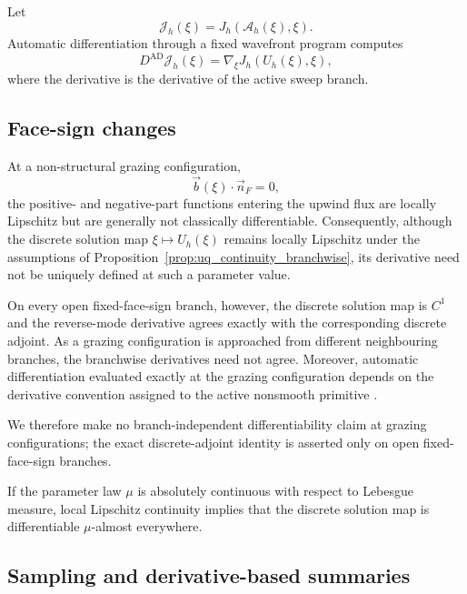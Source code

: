 \documentclass[final]{amsart}
\begin{document}
Let
\begin{equation}
  \mathcal{J}_h(\xi)
  =
  J_h(\mathcal{A}_h(\xi),\xi).
\end{equation}
Automatic differentiation through a fixed wavefront program computes
\begin{equation}
  D^{\mathrm{AD}}\mathcal{J}_h(\xi)
  =
  \nabla_\xi J_h(U_h(\xi),\xi),
  \label{eq:uq_ad_derivative}
\end{equation}
where the derivative is the derivative of the active sweep branch.

\subsection{Face-sign changes}

At a non-structural grazing configuration,
\[
  \vec b(\xi)\cdot\vec n_F=0,
\]
the positive- and negative-part functions entering the upwind flux are
locally Lipschitz but are generally not classically differentiable.
Consequently, although the discrete solution map
$\xi\mapsto U_h(\xi)$ remains locally Lipschitz under the assumptions of
Proposition~\ref{prop:uq_continuity_branchwise}, its derivative need not
be uniquely defined at such a parameter value.

On every open fixed-face-sign branch, however, the discrete solution
map is $C^1$ and the reverse-mode derivative agrees exactly with the
corresponding discrete adjoint.  As a grazing configuration is
approached from different neighbouring branches, the branchwise
derivatives need not agree.  Moreover, automatic differentiation
evaluated exactly at the grazing configuration depends on the
derivative convention assigned to the active nonsmooth primitive
\cite{LeeEtAl2020NonsmoothAD}.

We therefore make no branch-independent differentiability claim at
grazing configurations; the exact discrete-adjoint identity is asserted
only on open fixed-face-sign branches.

If the parameter law $\mu$ is absolutely continuous with respect to
Lebesgue measure, local Lipschitz continuity implies that the discrete
solution map is differentiable $\mu$-almost everywhere.

\subsection{Sampling and derivative-based summaries}
\end{document}
